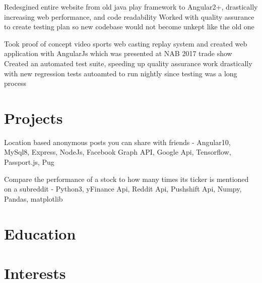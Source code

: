 \documentclass{my_resume}
\begin{document}
\workitemstwo
{Redesgined entire website from old java play framework to Angular2+, drastically increasing web performance, and code readability}
{Worked with quality assurance to create testing plan so new codebase would not become unkept like the old one}

\workitemstwo
{Took proof of concept video sports web casting replay system and created web application with AngularJs
 which was presented at NAB 2017 trade show}
{Created an automated test suite, speeding up quality assurance work drastically with new regression tests
 autoamted to run nightly since testing was a long process}

\section{Projects}

\projectitem
{Location based anonymous posts you can share with friends
 - Angular10, MySql8, Express, NodeJs, Facebook Graph API, Google Api, Tensorflow, Passport.js, Pug }

\projectitem
{Compare the performance of a stock to how many times its ticker is mentioned on a subreddit
 - Python3, yFinance Api, Reddit Api, Pushshift Api, Numpy, Pandas, matplotlib}

\section{Education}

\section{Interests}
\end{document}

